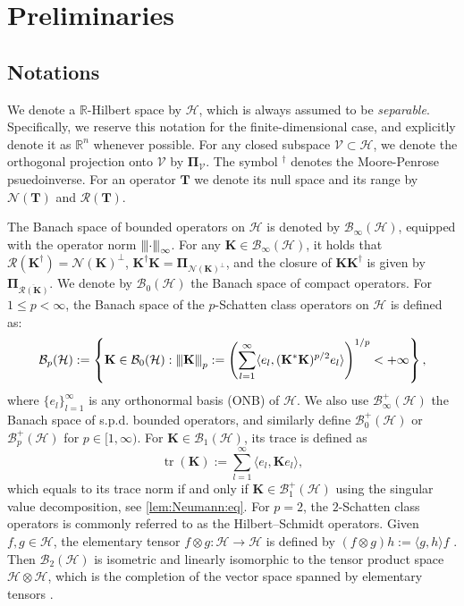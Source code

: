 \documentclass[noinfoline]{imsart}\setcounter{tocdepth}{2}
\renewcommand{\b}[1]{\mathbb{#1}} %
\newcommand{\m}[1]{\mathbf{#1}} %
\renewcommand{\c}[1]{\mathcal{#1}} %
\DeclareMathOperator*{\tr}{tr}
\newcommand{\vertiii}[1]{{\left\vert\kern-0.25ex\left\vert\kern-0.25ex\left\vert #1 
    \right\vert\kern-0.25ex\right\vert\kern-0.25ex\right\vert}} %
\theoremstyle{plain}
\begin{document}
\section{Preliminaries}\label{sec:prelim}

\subsection{Notations}
We denote a $\b{R}$-Hilbert space by $\c{H}$, which is always assumed to be \emph{separable}. Specifically, we reserve this notation for the finite-dimensional case, and explicitly denote it as $\b{R}^{n}$ whenever possible. For any closed subspace $\c{V} \subset \c{H}$, we denote the orthogonal projection onto $\c{V}$ by $\m{\Pi}_{\c{V}}$. The symbol $^{\dagger}$ denotes the Moore-Penrose psuedoinverse. For an operator $\m{T}$ we denote its null space and its range by $\c{N}(\m{T})$ and $\c{R}(\m{T})$. 

The Banach space of bounded operators on $\c{H}$ is denoted by $\c{B}_{\infty}(\c{H})$, equipped with the operator norm $\vertiii{\cdot}_{\infty}$. For any $\m{K} \in \c{B}_{\infty}(\c{H})$, it holds that $\c{R}(\m{K}^{\dagger}) = \c{N}(\m{K})^{\perp}$, $\m{K}^{\dagger} \m{K} = \m{\Pi}_{\c{N}(\m{K})^{\perp}}$, and the closure of $\m{K} \m{K}^{\dagger}$ is given by $\m{\Pi}_{\overline{\c{R}(\m{K})}}$. 
We denote by $\c{B}_{0}(\c{H})$ the Banach space of compact operators. For $1 \le p < \infty$, the Banach space of the $p$-Schatten class operators on $\c{H}$ is defined as:
\begin{equation*}
    \c{B}_{p}(\c{H}) := \left\{ \m{K} \in \c{B}_{0}(\c{H}) : \vertiii{\m{K}}_{p} := \left( \sum_{l=1}^{\infty} \langle e_{l}, (\m{K}^{*} \m{K})^{p/2} e_{l} \rangle \right)^{1/p} < +\infty \right\}, 
\end{equation*}
where $\{e_{l}\}_{l=1}^{\infty}$ is any orthonormal basis (ONB) of $\c{H}$. We also use $\c{B}_{\infty}^{+}(\c{H})$ the Banach space of s.p.d. bounded operators, and similarly define $\c{B}_{0}^{+}(\c{H})$ or $\c{B}_{p}^{+}(\c{H})$ for $p \in [1, \infty)$.
For $\m{K} \in \c{B}_{1}(\c{H})$, its trace is defined as
\begin{equation*}
    \tr (\m{K}) := \sum_{l=1}^{\infty} \langle e_{l}, \m{K} e_{l} \rangle,
\end{equation*}
which equals to its trace norm if and only if $\m{K} \in \c{B}_{1}^{+}(\c{H})$ using the singular value decomposition, see \cref{lem:Neumann:eq}. For $p=2$, the $2$-Schatten class operators is commonly referred to as the Hilbert–Schmidt operators. Given $f,g \in \c{H}$, the elementary tensor $f \otimes g: \c{H} \rightarrow \c{H}$ is defined by $(f \otimes g) h := \langle g, h \rangle f$ \cite{hsing2015theoretical, paulsen2016introduction}. Then $\c{B}_{2}(\c{H})$ is isometric and linearly isomorphic to the tensor product space $\c{H} \otimes \c{H}$, which is the completion of the vector space spanned by elementary tensors \cite{kadison1986fundamentals}. 
\end{document}
